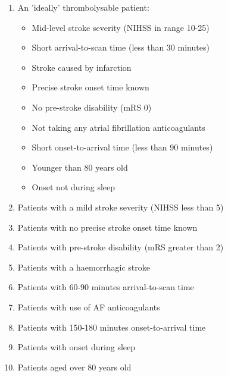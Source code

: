 
\iffalse
We analysed the observed and predicted use of thrombolysis in subgroups of patients. One `ideally' thrombolysable patient, and nine (one per feature) 'sub-optimal' thrombolysable patient groups (selecting patients based on one feature set to a sub-optimal value). We based the ideal definition on observing the relationships between feature values and thrombolysis use, and chose the 'sub-optimal' feature value by choosing a value that's within the contentious range for decision making (a feature value that corresponds with a SHAP value of zero, or the least favourable for binary features). The ten sub-groups are defined as:
\fi

\begin{enumerate}
  \item An 'ideally' thrombolysable patient:
  \begin{itemize}
    \item Mid-level stroke severity (NIHSS in range 10-25)
    \item Short arrival-to-scan time (less than 30 minutes)
    \item Stroke caused by infarction
    \item Precise stroke onset time known
    \item No pre-stroke disability (mRS 0)
    \item Not taking any atrial fibrillation anticoagulants
    \item Short onset-to-arrival time (less than 90 minutes)
    \item Younger than 80 years old
    \item Onset not during sleep
  \end{itemize}
  \item Patients with a mild stroke severity (NIHSS less than 5)
  \item Patients with no precise stroke onset time known
  \item Patients with pre-stroke disability (mRS greater than 2)
  \item Patients with a haemorrhagic stroke
  \item Patients with 60-90 minutes arrival-to-scan time
  \item Patients with use of AF anticoagulants
  \item Patients with 150-180 minutes onset-to-arrival time
  \item Patients with onset during sleep
  \item Patients aged over 80 years old
\end{enumerate}

